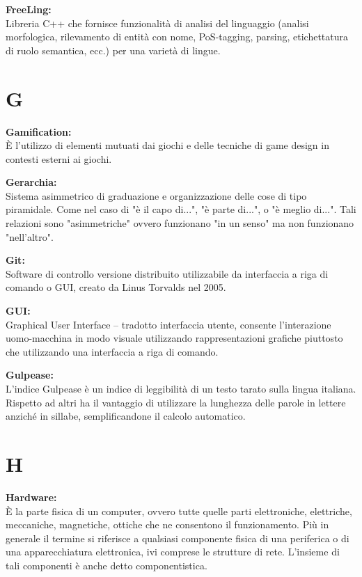 \documentclass[a4paper, oneside, openany, dvipsnames, table]{article}
\begin{document}
\textbf{FreeLing:}\\	Libreria C++ che fornisce funzionalità di analisi del linguaggio (analisi morfologica, rilevamento di entità con nome, PoS-tagging, parsing, etichettatura di ruolo semantica, ecc.) per una varietà di lingue.

\newpage
\section{G}

\textbf{Gamification:} \\  \`E l'utilizzo di elementi mutuati dai giochi e delle tecniche di game design in contesti esterni ai giochi.

\textbf{Gerarchia:}\\ Sistema asimmetrico di graduazione e organizzazione delle cose di tipo piramidale.  
Come nel caso di "è il capo di...", "è parte di...", o "è meglio di...". Tali relazioni sono "asimmetriche" ovvero funzionano "in un senso" ma non funzionano "nell'altro".

\textbf{Git:}\\	 Software di controllo versione distribuito utilizzabile da interfaccia a riga di comando o GUI, creato da Linus Torvalds nel 2005.

\textbf{GUI:}\\ Graphical User Interface -- tradotto interfaccia utente, consente l'interazione uomo-macchina in modo visuale utilizzando rappresentazioni grafiche piuttosto che utilizzando una interfaccia a riga di comando.

\textbf{Gulpease:} \\  L'indice Gulpease è un indice di leggibilità di un testo tarato sulla lingua italiana. Rispetto ad altri ha il vantaggio di utilizzare la lunghezza delle parole in lettere anziché in sillabe, semplificandone il calcolo automatico.

\newpage
\section{H}
\textbf{Hardware:}\\	\`E la parte fisica di un computer, ovvero tutte quelle parti elettroniche, elettriche, meccaniche, magnetiche, ottiche che ne consentono il funzionamento. Più in generale il termine si riferisce a qualsiasi componente fisica di una periferica o di una apparecchiatura elettronica, ivi comprese le strutture di rete. L'insieme di tali componenti è anche detto componentistica.
\end{document}
